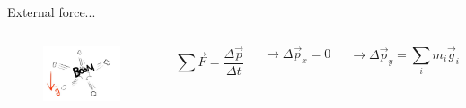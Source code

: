 \documentclass[]{beamer}
\begin{document}
                

\begin{frame}
    External force...
     

     
     
       \begin{columns}[c]
         \column{2in}  %
        
         \begin{figure}[h!]  
             \includegraphics[width=1.\textwidth]{images/4.jpg}
           
           \end{figure}
     
           
         \column{2in}
      
     
   
 
     
     
     \begin{equation*}
         \sum \vec F = \frac{\Delta \vec p}{\Delta t}
     \end{equation*}
     
     \begin{equation*}
         \rightarrow \Delta \vec p_x= 0
     \end{equation*}
     
     \begin{equation*}
         \rightarrow \Delta \vec p_y= \sum_i m_i\vec g_i
     \end{equation*}
     

     
 \end{columns}




       \end{frame}
\end{document}
